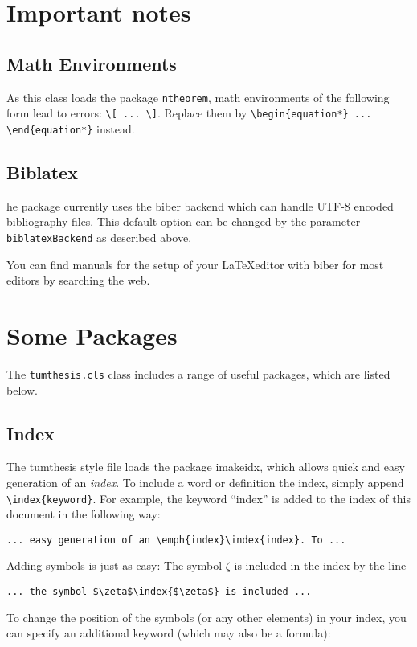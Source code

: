 \section{Important notes}
\label{sec:intro:notes}
\subsection{Math Environments}
\label{sec:intro:mathEnvironments}
As this class loads the package \texttt{ntheorem}, math environments of the following form lead to errors: \verb|\[ ... \]|. Replace them by \verb|\begin{equation*} ... \end{equation*}| instead.

\subsection{Biblatex}
\label{sec:intro:biblatex}
he package currently uses the biber backend which can handle UTF-8 encoded bibliography files. This default option can be changed by the parameter \texttt{biblatexBackend} as described above.

You can find manuals for the setup of your \LaTeX editor with biber for most editors by searching the web.

\section{Some Packages}
\label{sec:intro:packages}
The \texttt{tumthesis.cls} class includes a range of useful packages, which are listed below.

\subsection{Index}
\label{sec:intro:index}
The tumthesis style file loads the package imakeidx, which allows quick and easy generation of an \emph{index}. To include a word or definition the index, simply  append \verb|\index{keyword}|. For example, the keyword \enquote{index} is added to the index of this document in the following way:
\begin{lstlisting}[language={[LaTeX]TeX}]
  ... easy generation of an \emph{index}\index{index}. To ...
\end{lstlisting}
Adding symbols is just as easy: The symbol $\zeta$\index{$\zeta$} is included in the index by the line
\begin{lstlisting}[language={[LaTeX]TeX}]
  ... the symbol $\zeta$\index{$\zeta$} is included ...
\end{lstlisting}
To change the position of the symbols (or any other elements) in your index, you can specify an additional keyword (which may also be a formula):

